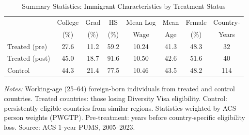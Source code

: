 \begin{table}[t]
\centering
\caption{Summary Statistics: Immigrant Characteristics by Treatment Status}
\label{tab:summary}
\small
\begin{threeparttable}
\begin{tabular}{lccccccc}
\toprule
 & College & Grad & HS & Mean Log & Mean & Female & Country- \\
 & (\%) & (\%) & (\%) & Wage & Age & (\%) & Years \\
\midrule
Treated (pre) & 27.6 & 11.2 & 59.2 & 10.24 & 41.3 & 48.3 & 32 \\
Treated (post) & 45.0 & 18.7 & 91.6 & 10.50 & 42.6 & 51.6 & 40 \\
Control & 44.3 & 21.4 & 77.5 & 10.46 & 43.5 & 48.2 & 114 \\
\bottomrule
\end{tabular}
\begin{tablenotes}[flushleft]
\small
\item \textit{Notes:} Working-age (25--64) foreign-born individuals from treated and control countries. Treated countries: those losing Diversity Visa eligibility. Control: persistently eligible countries from similar regions. Statistics weighted by ACS person weights (PWGTP). Pre-treatment: years before country-specific eligibility loss. Source: ACS 1-year PUMS, 2005--2023.
\end{tablenotes}
\end{threeparttable}
\end{table}
